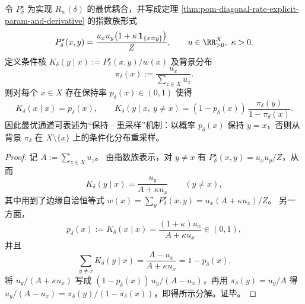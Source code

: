 
\begin{proposition}[保持—重采样通道表示]\label{prop:pom-diagonal-rate-keep-resample-channel}
令 \(P^\star_\delta\) 为实现 \(R_w(\delta)\) 的最优耦合，并写成定理 \ref{thm:pom-diagonal-rate-explicit-param-and-derivative} 的指数族形式
\[
P^\star_\delta(x,y)=\frac{u_xu_y\bigl(1+\kappa\,\mathbf 1_{\{x=y\}}\bigr)}{Z},
\qquad
u\in\RR_{>0}^X,\ \kappa>0.
\]
定义条件核 \(K_\delta(y\mid x):=P^\star_\delta(x,y)/w(x)\) 及背景分布
\[
\pi_\delta(x):=\frac{u_x}{\sum_{z\in X}u_z}.
\]
则对每个 \(x\in X\) 存在保持率 \(p_\delta(x)\in(0,1)\) 使得
\[
K_\delta(x\mid x)=p_\delta(x),\qquad
K_\delta(y\mid x,\ y\ne x)=(1-p_\delta(x))\,\frac{\pi_\delta(y)}{1-\pi_\delta(x)}.
\]
因此最优通道可表述为“保持—重采样”机制：以概率 \(p_\delta(x)\) 保持 \(y=x\)，否则从背景 \(\pi_\delta\) 在 \(X\setminus\{x\}\) 上的条件化分布重采样。
\end{proposition}
\begin{proof}
记 \(A:=\sum_{z\in X}u_z\)。
由指数族表示，对 \(y\ne x\) 有 \(P^\star_\delta(x,y)=u_xu_y/Z\)，从而
\[
K_\delta(y\mid x)=\frac{u_y}{A+\kappa u_x}\qquad(y\ne x),
\]
其中用到了边缘自洽恒等式 \(w(x)=\sum_y P^\star_\delta(x,y)=u_x(A+\kappa u_x)/Z\)。
另一方面，
\[
p_\delta(x):=K_\delta(x\mid x)
=\frac{(1+\kappa)u_x}{A+\kappa u_x}\in(0,1),
\]
并且
\[
\sum_{y\ne x}K_\delta(y\mid x)=\frac{A-u_x}{A+\kappa u_x}=1-p_\delta(x).
\]
将 \(u_y/(A+\kappa u_x)\) 写成 \((1-p_\delta(x))\,u_y/(A-u_x)\)，再用 \(\pi_\delta(y)=u_y/A\) 得
\(
u_y/(A-u_x)=\pi_\delta(y)/(1-\pi_\delta(x))
\)，即得所示分解。证毕。
\end{proof}



